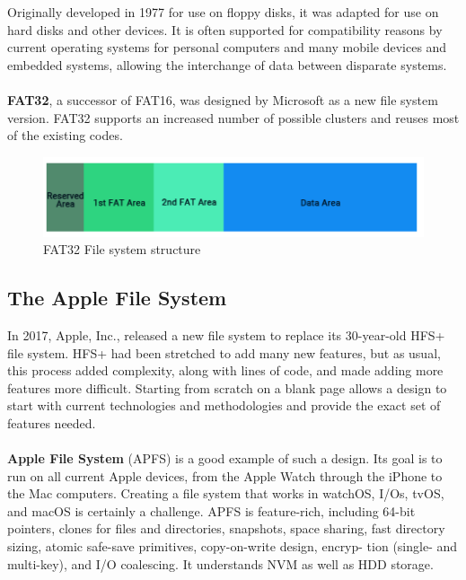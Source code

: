 Originally developed in 1977 for use on floppy disks, it was adapted for use on
hard disks and other devices. It is often supported for compatibility reasons by current operating systems
for personal computers and many mobile devices and embedded systems,
allowing the interchange of data between disparate systems.

\paragraph{}
\textbf{FAT32}, a successor of FAT16, was designed by Microsoft as a new file system
version. FAT32 supports an increased number of possible clusters and reuses
most of the existing codes.

\begin{figure}[h!]
    \centering
    \includegraphics[width=0.55\linewidth]{img/zndfg.png}
    \caption{FAT32 File system structure}
\end{figure}


\subsection{The Apple File System}

In 2017, Apple, Inc., released a new file system to replace its 30-year-old HFS+ file system. HFS+ had been stretched to add many new features, but as usual, this process added complexity, along with lines of code, and made adding more features more difficult. Starting from scratch on a blank page allows a design to start with current technologies and methodologies and provide the exact set of features needed.

\paragraph{}

\textbf{Apple File System} (APFS) is a good example of such a design. Its goal is to run on all current Apple devices, from the Apple Watch through the iPhone to the Mac computers. Creating a file system that works in watchOS, I/Os, tvOS, and macOS is certainly a challenge. APFS is feature-rich, including 64-bit pointers, clones for files and directories, snapshots, space sharing, fast directory sizing, atomic safe-save primitives, copy-on-write design, encryp- tion (single- and multi-key), and I/O coalescing. It understands NVM as well as HDD storage.

